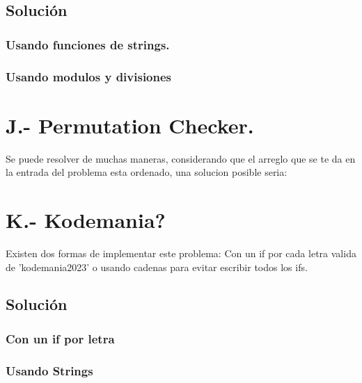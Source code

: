 \documentclass[12pt,letterpaper,titlepage]{article}
\begin{document}
\subsection{Solución}
\subsubsection{Usando funciones de strings.}

\subsubsection{Usando modulos y divisiones}

\clearpage\section{J.- Permutation Checker.}
Se puede resolver de muchas maneras, considerando que el arreglo que se te da en la entrada del problema esta ordenado, una solucion posible seria:

\clearpage\section{K.- Kodemania?}
Existen dos formas de implementar este problema: Con un if por cada letra valida de 'kodemania2023' o usando cadenas para evitar escribir todos los ifs.
\subsection{Solución}
\subsubsection{Con un if por letra}

\subsubsection{Usando Strings}

\end{document}
